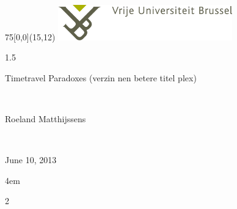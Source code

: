 \documentclass[10pt,a4paper]{scrartcl}
\begin{document}
\begin{textblock}{75}[0,0](15,12)
  \includegraphics[width=75.5mm]{VUB_logo_kleur.png}
\end{textblock}

\begin{center}
\begin{spacing}{1.5}
\begin{LARGE}
Timetravel Paradoxes (verzin nen betere titel plex)
\end{LARGE}
\\
\begin{large}
Roeland Matthijssens
\end{large}
\\
\begin{large}
June 10, 2013
\end{large}
\end{spacing}
\end{center}
\begingroup
\leftskip4em
\rightskip\leftskip

\par
\endgroup

\begin{multicols}{2}

\end{multicols}
\end{document}
